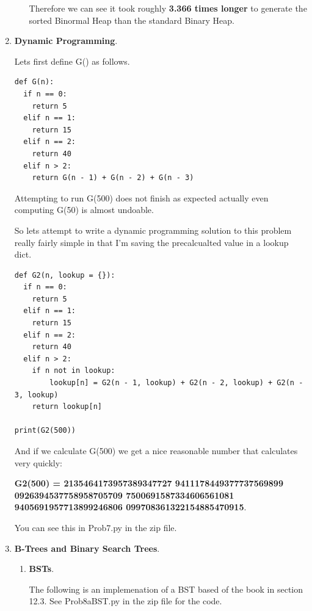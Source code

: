 \documentclass{article}
\begin{document}
\begin{enumerate}
\begin{enumerate}
  Therefore we can see it took roughly \textbf{3.366 times longer} to generate the sorted Binormal Heap than the standard Binary Heap.

  \end{enumerate}

  \item \textbf{Dynamic Programming}.
  
  Lets first define G() as follows.

  \begin{lstlisting}
def G(n):
  if n == 0:
    return 5
  elif n == 1:
    return 15
  elif n == 2:
    return 40    
  elif n > 2:
    return G(n - 1) + G(n - 2) + G(n - 3)    
  \end{lstlisting}

  Attempting to run G(500) does not finish as expected actually even computing G(50) is almost undoable. 

  So lets attempt to write a dynamic programming solution to this problem really fairly simple in that I'm saving the precalcualted value in a lookup dict.

  \begin{lstlisting}
def G2(n, lookup = {}):
  if n == 0:
    return 5
  elif n == 1:
    return 15
  elif n == 2:
    return 40    
  elif n > 2:
    if n not in lookup:
        lookup[n] = G2(n - 1, lookup) + G2(n - 2, lookup) + G2(n - 3, lookup)            
    return lookup[n]

print(G2(500))    
  \end{lstlisting}

  And if we calculate G(500) we get a nice reasonable number that calculates very quickly:
  
  \textbf{G2(500) = 2135464173957389347727
                    9411178449377737569899
                    0926394537758958705709
                    7500691587334606561081
                    9405691957713899246806
                    099708361322154885470915}.

  
  You can see this in Prob7.py in the zip file.

  \item \textbf{B-Trees and Binary Search Trees}.
  
  \begin{enumerate}
    \item \textbf{BSTs}.
    
    The following is an implemenation of a BST based of the book in section 12.3.
    See Prob8aBST.py in the zip file for the code.


\end{enumerate}
\end{enumerate}
\end{document}
